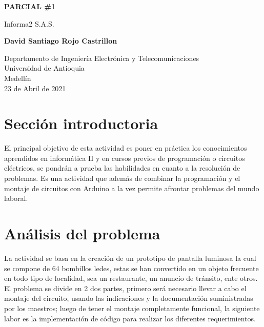 \documentclass{article}
\begin{document}
\begin{titlepage}
    \begin{center}
        \vspace*{1cm}
            
        \Huge
        \textbf{PARCIAL \#1}
            
        \vspace{0.5cm}
        \LARGE
        Informa2 S.A.S.
            
        \vspace{1.5cm}
            
        \textbf{David Santiago Rojo Castrillon}
            
        \vfill
            
        \vspace{0.8cm}
            
        \Large
        Departamento de Ingeniería Electrónica y Telecomunicaciones\\
        Universidad de Antioquia\\
        Medellín\\
        23 de Abril de 2021
            
    \end{center}
\end{titlepage}

\tableofcontents
\newpage
\section{Sección introductoria}\label{intro}
El principal objetivo de esta actividad es poner en práctica los conocimientos aprendidos en informática II y en cursos previos de programación o circuitos eléctricos, se pondrán a prueba las habilidades en cuanto a la resolución de problemas. Es una actividad que además de combinar la programación y el montaje de circuitos con Arduino a la vez permite afrontar problemas del mundo laboral.

\section{Análisis del problema} \label{contenido}
La actividad se basa en la creación de un prototipo de pantalla luminosa la cual se compone de 64 bombillos ledes, estas se han convertido en un objeto frecuente en todo tipo de localidad, sea un restaurante, un anuncio de tránsito, ente otros.
El problema se divide en 2 dos partes, primero será necesario llevar a cabo el montaje del circuito, usando las indicaciones y la documentación suministradas por los maestros; luego de tener el montaje completamente funcional, la siguiente labor es la implementación de código para realizar los diferentes requerimientos.
\end{document}
